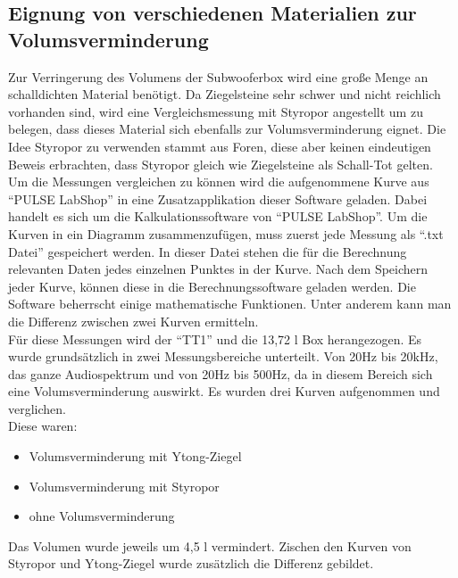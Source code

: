 \subsection{Eignung von verschiedenen Materialien zur Volumsverminderung}\label{subsec:4.4.1}
Zur Verringerung des Volumens der Subwooferbox wird eine große Menge an schalldichten Material benötigt.
Da Ziegelsteine sehr schwer und nicht reichlich vorhanden sind, wird eine Vergleichsmessung mit Styropor angestellt um zu belegen, dass dieses Material sich ebenfalls zur Volumsverminderung eignet.
Die Idee Styropor zu verwenden stammt aus Foren, diese aber keinen eindeutigen Beweis erbrachten, dass Styropor gleich wie Ziegelsteine als Schall-Tot gelten.\\
Um die Messungen vergleichen zu können wird die aufgenommene Kurve aus \enquote{PULSE LabShop} in eine Zusatzapplikation dieser Software geladen.
Dabei handelt es sich um die Kalkulationssoftware von \enquote{PULSE LabShop}.
Um die Kurven in ein Diagramm zusammenzufügen, muss zuerst jede Messung als 
\enquote{.txt Datei} gespeichert werden.
In dieser Datei stehen die für die Berechnung relevanten Daten jedes einzelnen Punktes in der Kurve.
Nach dem Speichern jeder Kurve, können diese in die Berechnungssoftware geladen werden.
Die Software beherrscht einige mathematische Funktionen.
Unter anderem kann man die Differenz zwischen zwei Kurven ermitteln.\\ 
Für diese Messungen wird der \enquote{TT1} und die 13,72 l Box herangezogen.
Es wurde grundsätzlich in zwei Messungsbereiche unterteilt.
Von 20Hz bis 20kHz, das ganze Audiospektrum und von 20Hz bis 500Hz, da in diesem Bereich sich eine Volumsverminderung auswirkt.
Es wurden drei Kurven aufgenommen und verglichen.\\
Diese waren:
\begin{itemize}
	\item Volumsverminderung mit Ytong-Ziegel
	\item Volumsverminderung mit Styropor
	\item ohne Volumsverminderung
\end{itemize}
Das Volumen wurde jeweils um 4,5 l vermindert.
Zischen den Kurven von Styropor und Ytong-Ziegel wurde zusätzlich die Differenz gebildet.

